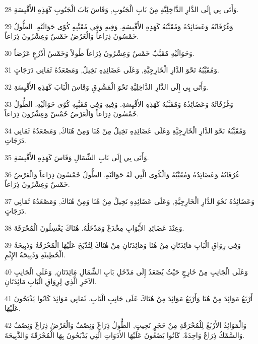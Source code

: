 \par 28 وَأَتَى بِي إِلَى الدَّارِ الدَّاخِلِيَّةِ مِنْ بَابِ الْجَنُوبِ, وَقَاسَ بَابَ الْجَنُوبِ كَهَذِهِ الأَقْيِسَةِ.
\par 29 وَغُرُفَاتُهُ وَعَضَائِدُهُ وَمُقَبَّبُهُ كَهَذِهِ الأَقْيِسَةِ. وَفِيهِ وَفِي مُقَبَّبِهِ كُوًى حَوَالَيْهِ. الطُّولُ خَمْسُونَ ذِرَاعاً وَالْعَرْضُ خَمْسٌ وَعِشْرُونَ ذِرَاعاً.
\par 30 وَحَوَالَيْهِ مُقَبَّبٌ خَمْسٌ وَعِشْرُونَ ذِرَاعاً طُولاً وَخَمْسُ أَذْرُعٍ عَرْضاً.
\par 31 وَمُقَبَّبُهُ نَحْوَ الدَّارِ الْخَارِجِيَّةِ, وَعَلَى عَضَائِدِهِ نَخِيلٌ, وَمَصْعَدُهُ ثَمَانِي دَرَجَاتٍ.
\par 32 وَأَتَى بِي إِلَى الدَّارِ الدَّاخِلِيَّةِ نَحْوَ الْمَشْرِقِ وَقَاسَ الْبَابَ كَهَذِهِ الأَقْيِسَةِ.
\par 33 وَغُرُفَاتُهُ وَعَضَائِدُهُ وَمُقَبَّبُهُ كَهَذِهِ الأَقْيِسَةِ. وَفِيهِ وَفِي مُقَبَّبِهِ كُوًى حَوَالَيْهِ. الطُّولُ خَمْسُونَ ذِرَاعاً وَالْعَرْضُ خَمْسٌ وَعِشْرُونَ ذِرَاعاً.
\par 34 وَمُقَبَّبُهُ نَحْوَ الدَّارِ الْخَارِجِيَّةِ وَعَلَى عَضَائِدِهِ نَخِيلٌ مِنْ هُنَا وَمِنْ هُنَاكَ, وَمَصْعَدُهُ ثَمَانِي دَرَجَاتٍ.
\par 35 وَأَتَى بِي إِلَى بَابِ الشِّمَالِ وَقَاسَ كَهَذِهِ الأَقْيِسَةِ.
\par 36 غُرُفَاتُهُ وَعَضَائِدُهُ وَمُقَبَّبُهُ وَالْكُوى الَّتِي لَهُ حَوَالَيْهِ. الطُّولُ خَمْسُونَ ذِرَاعاً وَالْعَرْضُ خَمْسٌ وَعِشْرُونَ ذِرَاعاً.
\par 37 وَعَضَائِدُهُ نَحْوَ الدَّارِ الْخَارِجِيَّةِ, وَعَلَى عَضَائِدِهِ نَخِيلٌ مِنْ هُنَا وَمِنْ هُنَاكَ, وَمَصْعَدُهُ ثَمَانِي دَرَجَاتٍ.
\par 38 وَعِنْدَ عَضَائِدِ الأَبْوَابِ مِخْدَعٌ وَمَدْخَلُهُ. هُنَاكَ يَغْسِلُونَ الْمُحْرَقَةَ.
\par 39 وَفِي رِوَاقِ الْبَابِ مَائِدَتَانِ مِنْ هُنَا وَمَائِدَتَانِ مِنْ هُنَاكَ لِتُذْبَحَ عَلَيْهَا الْمُحْرَقَةُ وَذَبِيحَةُ الْخَطِيئَةِ وَذَبِيحَةُ الإِثْمِ.
\par 40 وَعَلَى الْجَانِبِ مِنْ خَارِجٍ حَيْثُ يُصْعَدُ إِلَى مَدْخَلِ بَابِ الشِّمَالِ مَائِدَتَانِ, وَعَلَى الْجَانِبِ الآخَرِ الَّذِي لِرِوَاقِ الْبَابِ مَائِدَتَانِ.
\par 41 أَرْبَعُ مَوَائِدَ مِنْ هُنَا وَأَرْبَعُ مَوَائِدَ مِنْ هُنَاكَ عَلَى جَانِبِ الْبَابِ. ثَمَانِي مَوَائِدَ كَانُوا يَذْبَحُونَ عَلَيْهَا.
\par 42 وَالْمَوَائِدُ الأَرْبَعُ لِلْمُحْرَقَةِ مِنْ حَجَرٍ نَحِيتٍ, الطُّولُ ذِرَاعٌ وَنِصْفٌ وَالْعَرْضُ ذِرَاعٌ وَنِصْفٌ وَالسَّمْكُ ذِرَاعٌ وَاحِدَةٌ. كَانُوا يَضَعُونَ عَلَيْهَا الأَدَوَاتِ الَّتِي يَذْبَحُونَ بِهَا الْمُحْرَقَةَ وَالذَّبِيحَةَ.
